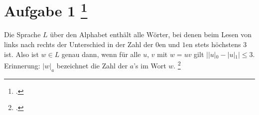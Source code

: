 \documentclass{lehramt-informatik-aufgabe}
\begin{document}
\let\l=\liLeereZelle
\let\f=\liFussnote
\def\z#1{
  \liZustandsMengenSammlungNr{#1}{
    {
      {0} {0}
      {1} {0,1}
      {2} {0,2}
      {3} {0,1,2}
    }
  }
}
\let\s=\liZustandsnameGross
\let\Z=\liZustandsPaar


\section{Aufgabe 1
\footcite{examen:66115:2015:03}}

Die Sprache $L$ über den Alphabet  enthält alle Wörter,
bei denen beim Lesen von links nach rechts der Unterschied in der Zahl
der $0$en und $1$en stets höchstens $3$ ist. Also ist $w \in L$ genau
dann, wenn für alle $u$, $v$ mit $w = uv$ gilt $||u|_0 - |u|_1| \leq 3$.
Erinnerung: $|w|_a$ bezeichnet die Zahl der $a$’s im Wort $w$.
\footcite[Aufgabe 10]{theo:ab:1}
\end{document}
